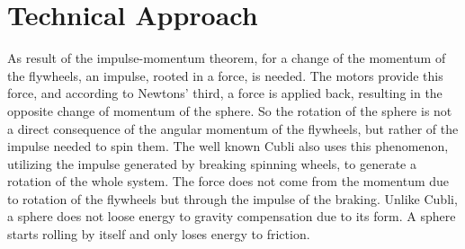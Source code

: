 \section{Technical Approach}
\label{sec:TechnicalApproach}

As result of the impulse-momentum theorem, for a change of the momentum of the flywheels, an impulse, rooted in a force, is needed. 
The motors provide this force, and according to Newtons' third, a force is applied back, resulting in the opposite change of momentum of the sphere. 
So the rotation of the sphere is not a direct consequence of the angular momentum of the flywheels, but rather of the impulse needed to spin them. 
The well known Cubli \cite{cubliIROS12} also uses this phenomenon, utilizing the impulse generated by breaking spinning wheels, to generate a rotation of the whole system. The force does not come from the momentum due to rotation of the flywheels but through the impulse of the braking.
Unlike Cubli, a sphere does not loose energy to gravity compensation due to its form.
A sphere starts rolling by itself and only loses energy to friction.

